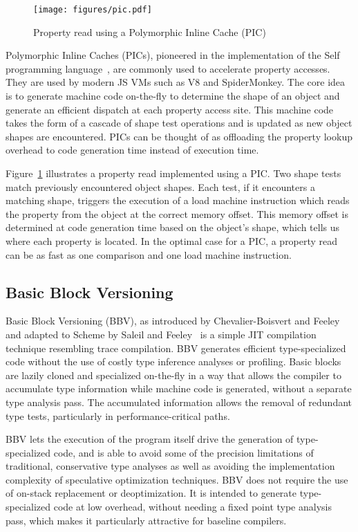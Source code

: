 \documentclass[preprint]{sigplanconf}
\begin{document}
\begin{figure}[tb]
\begin{center}
\texttt{[image: figures/pic.pdf]}
\end{center}
\caption{Property read using a Polymorphic Inline Cache (PIC)\label{fig:pic}}
\end{figure}

Polymorphic Inline Caches (PICs), pioneered in the implementation of the Self
programming language~\cite{self, self_pic}, are commonly used to accelerate
property accesses. They are used by modern JS VMs
such as V8 and SpiderMonkey. The core idea is to generate machine code
on-the-fly to determine the shape of an object and generate an efficient
dispatch at each property access site. This machine code takes the form of a
cascade of shape test operations and is updated as new object shapes are
encountered. PICs can be thought of as offloading the property lookup overhead
to code generation time instead of execution time.

Figure~\ref{fig:pic} illustrates a property read implemented using a PIC.
Two shape tests match previously encountered object shapes. Each test, if it
encounters a matching shape, triggers the execution of a load machine
instruction which reads the property from the object at the correct memory
offset. This memory offset is determined at code generation time based on the
object's shape, which tells us where each property is located. In the optimal
case for a PIC, a property read can be as fast as one comparison and one load
machine instruction.

\subsection{Basic Block Versioning\label{sec:bbv}}

Basic Block Versioning (BBV), as introduced by Chevalier-Boisvert and
Feeley~\cite{bbv_ecoop} and adapted to Scheme by Saleil and
Feeley~\cite{vers_scheme} is a simple JIT compilation technique resembling
trace compilation. BBV generates efficient type-specialized code without the
use of costly type inference analyses or profiling. Basic blocks are
lazily cloned and specialized on-the-fly in a way that allows the compiler
to accumulate type information while machine code is generated, without a
separate type analysis pass. The accumulated information allows the removal
of redundant type tests, particularly in performance-critical paths.

BBV lets the execution of the program itself drive the
generation of type-specialized code, and is able to avoid some of the
precision limitations of traditional, conservative type analyses as well as
avoiding the implementation complexity of speculative optimization techniques.
BBV does not require the use of on-stack replacement or deoptimization. It is
intended to generate type-specialized code at low overhead, without
needing a fixed point type analysis pass, which makes it particularly
attractive for baseline compilers.
\end{document}
